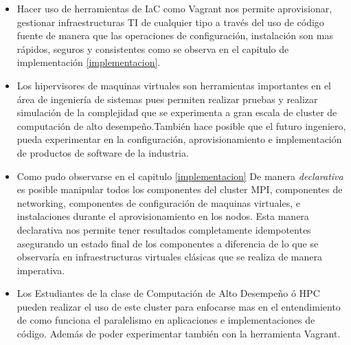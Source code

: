 \documentclass[letterpaper, 12pt, oneside]{article}
\begin{document}
      \begin{itemize}
        \item Hacer uso de herramientas de IaC como Vagrant nos permite aprovisionar, gestionar infraestructuras TI de cualquier tipo a través del uso de código fuente de manera que las operaciones de configuración, instalación son mas rápidos, seguros y consistentes como se observa en el capitulo de implementación \ref{implementacion}.
        \item Los hipervisores de maquinas virtuales son herramientas importantes en el área de ingeniería de sistemas pues permiten realizar pruebas y realizar simulación de la complejidad que se experimenta a gran escala de cluster de computación de alto desempeño.También hace posible que el futuro ingeniero, pueda experimentar en la configuración, aprovisionamiento e implementación de productos de software de la industria. 
        
        \item Como pudo observarse en el capitulo \ref{implementacion} De manera \textit{declarativa} es posible manipular todos los componentes del cluster MPI, componentes de networking, componentes de configuración de maquinas virtuales, e instalaciones durante el aprovisionamiento en los nodos. Esta manera declarativa nos permite tener resultados completamente idempotentes asegurando un estado final de los componentes a diferencia de lo que se observaría en infraestructuras virtuales clásicas que se realiza de manera imperativa.
        \item Los Estudiantes de la clase de Computación de Alto Desempeño ó HPC pueden realizar el uso de este cluster para enfocarse mas en el entendimiento de como funciona el paralelismo en aplicaciones e implementaciones de código. Además de poder experimentar también con la herramienta Vagrant.
        
    \end{itemize}
    \clearpage
\end{document}
